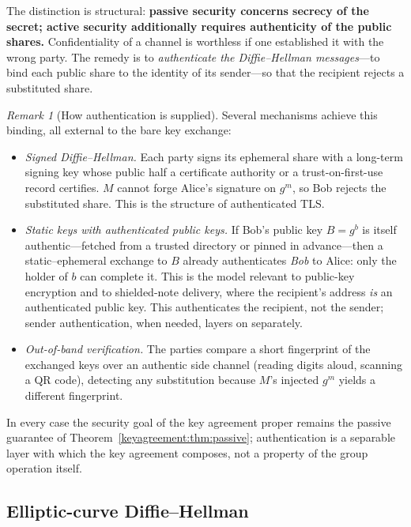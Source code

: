 \documentclass[11pt,a4paper]{article}
\theoremstyle{definition}
\theoremstyle{remark}
\newtheorem{remark}[theorem]{Remark}
\begin{document}
The distinction is structural: \textbf{passive security concerns secrecy of the secret; active security additionally requires authenticity of the public shares.} Confidentiality of a channel is worthless if one established it with the wrong party. The remedy is to \emph{authenticate the Diffie--Hellman messages}---to bind each public share to the identity of its sender---so that the recipient rejects a substituted share.

\begin{remark}[How authentication is supplied]\label{keyagreement:rem:auth-supplied}
Several mechanisms achieve this binding, all external to the bare key exchange:
\begin{itemize}
  \item \emph{Signed Diffie--Hellman.} Each party signs its ephemeral share with a long-term signing key whose public half a certificate authority or a trust-on-first-use record certifies. \(M\) cannot forge Alice's signature on \(g^m\), so Bob rejects the substituted share. This is the structure of authenticated TLS.
  \item \emph{Static keys with authenticated public keys.} If Bob's public key \(B = g^b\) is itself authentic---fetched from a trusted directory or pinned in advance---then a static--ephemeral exchange to \(B\) already authenticates \emph{Bob} to Alice: only the holder of \(b\) can complete it. This is the model relevant to public-key encryption and to shielded-note delivery, where the recipient's address \emph{is} an authenticated public key. This authenticates the recipient, not the sender; sender authentication, when needed, layers on separately.
  \item \emph{Out-of-band verification.} The parties compare a short fingerprint of the exchanged keys over an authentic side channel (reading digits aloud, scanning a QR code), detecting any substitution because \(M\)'s injected \(g^m\) yields a different fingerprint.
\end{itemize}
In every case the security goal of the key agreement proper remains the passive guarantee of Theorem~\ref{keyagreement:thm:passive}; authentication is a separable layer with which the key agreement composes, not a property of the group operation itself.
\end{remark}

\subsection{Elliptic-curve Diffie--Hellman}\label{keyagreement:subsec:ecdh}
\end{document}
